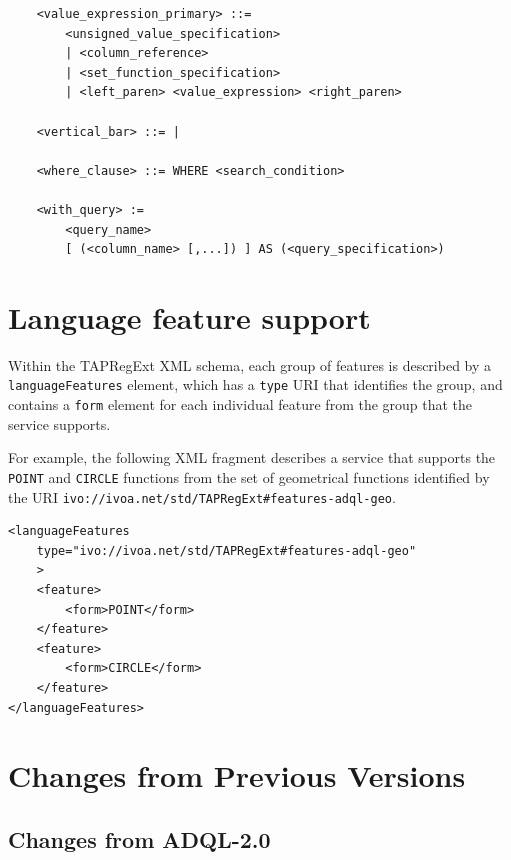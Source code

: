\documentclass[11pt,a4paper]{ivoa}
\begin{document}
\begin{verbatim}
    <value_expression_primary> ::=
        <unsigned_value_specification>
        | <column_reference>
        | <set_function_specification>
        | <left_paren> <value_expression> <right_paren>

    <vertical_bar> ::= |

    <where_clause> ::= WHERE <search_condition>

    <with_query> :=
        <query_name>
        [ (<column_name> [,...]) ] AS (<query_specification>)

\end{verbatim}

\section{Language feature support}
\label{sec:features}

Within the TAPRegExt \citep{std:TAPREGEXT} XML schema, each group of features is
described by a \verb:languageFeatures: element, which has a \verb:type:
URI that identifies the group, and contains a \verb:form: element for each
individual feature from the group that the service supports.

For example, the following XML fragment describes a service that supports the
\verb:POINT: and \verb:CIRCLE: functions from the set of geometrical functions
identified by the URI \verb|ivo://ivoa.net/std/TAPRegExt#features-adql-geo|.

\begin{verbatim}
<languageFeatures
    type="ivo://ivoa.net/std/TAPRegExt#features-adql-geo"
    >
    <feature>
        <form>POINT</form>
    </feature>
    <feature>
        <form>CIRCLE</form>
    </feature>
</languageFeatures>    
\end{verbatim}

\section{Changes from Previous Versions}
\label{sec:changes}
\subsection{Changes from ADQL-2.0}
\end{document}
